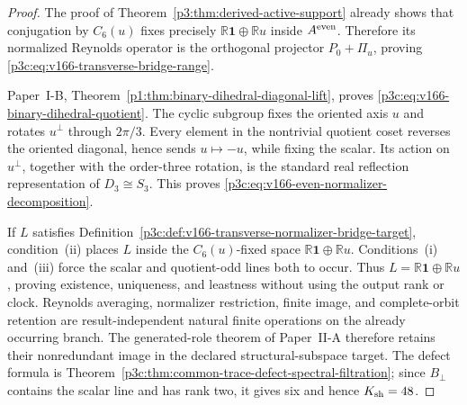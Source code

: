 \documentclass[12pt,a4paper]{article}
\begin{document}
\begin{proof}
The proof of Theorem~\ref{p3:thm:derived-active-support} already shows that
conjugation by \(C_6(u)\) fixes precisely
\(\mathbb R\mathbf1\oplus\mathbb Ru\) inside \(A^{\rm even}\).  Therefore its
normalized Reynolds operator is the orthogonal projector
\(P_0+\Pi_u\), proving \eqref{p3c:eq:v166-transverse-bridge-range}.

Paper~I-B, Theorem~\ref{p1:thm:binary-dihedral-diagonal-lift}, proves
\eqref{p3c:eq:v166-binary-dihedral-quotient}.  The cyclic subgroup fixes the
oriented axis \(u\) and rotates \(u^\perp\) through \(2\pi/3\).  Every element
in the nontrivial quotient coset reverses the oriented diagonal, hence sends
\(u\mapsto-u\), while fixing the scalar.  Its action on \(u^\perp\), together
with the order-three rotation, is the standard real reflection
representation of \(D_3\cong S_3\).  This proves
\eqref{p3c:eq:v166-even-normalizer-decomposition}.

If \(L\) satisfies Definition~\ref{p3c:def:v166-transverse-normalizer-bridge-target},
condition~(ii) places \(L\) inside the \(C_6(u)\)-fixed space
\(\mathbb R\mathbf1\oplus\mathbb Ru\).  Conditions~(i) and~(iii) force the
scalar and quotient-odd lines both to occur.  Thus
\(L=\mathbb R\mathbf1\oplus\mathbb Ru\), proving existence, uniqueness, and
leastness without using the output rank or clock.  Reynolds averaging,
normalizer restriction, finite image, and complete-orbit retention are
result-independent natural finite operations on the already occurring
branch.  The generated-role theorem of Paper~II-A therefore retains their
nonredundant image in the declared structural-subspace target.  The defect
formula is Theorem~\ref{p3c:thm:common-trace-defect-spectral-filtration}; since
\(B_\perp\) contains the scalar line and has rank two, it gives six and hence
\(K_{\rm sh}=48\).
\end{proof}
\end{document}
